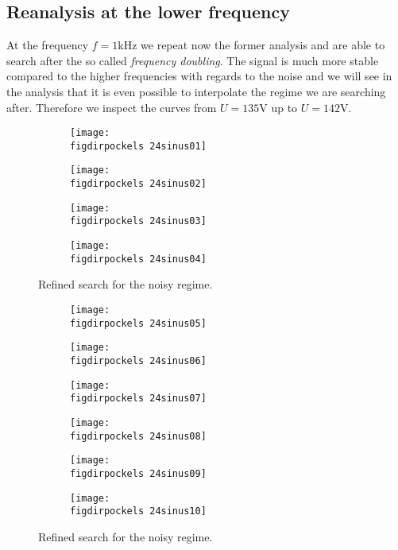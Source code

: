 \subsection{Reanalysis at the lower frequency}
At the frequency $f=1$kHz we repeat now the former analysis and are
able to search after the so called \textit{frequency doubling}.
The signal is much more stable compared to the higher frequencies 
with regards to the noise and we will see in the analysis that
it is even possible to interpolate the regime we are searching after.
Therefore we inspect the curves from $U=135$V up to $U=142$V.
\begin{figure}
    \begin{subfigure}[b]{\picwidth}
        \texttt{[image: \\figdirpockels 24sinus01]}
        \caption{}
    \end{subfigure}
    \begin{subfigure}[b]{\picwidth}
        \texttt{[image: \\figdirpockels 24sinus02]}
        \caption{}
    \end{subfigure}
    \begin{subfigure}[b]{\picwidth}
        \texttt{[image: \\figdirpockels 24sinus03]}
        \caption{}
    \end{subfigure}
    \begin{subfigure}[b]{\picwidth}
        \texttt{[image: \\figdirpockels 24sinus04]}
        \caption{}
    \end{subfigure}
    \caption{Refined search for the noisy regime.}
    \label{fig:sinus7}
\end{figure}

\begin{figure}
    \begin{subfigure}[b]{\picwidth}
        \texttt{[image: \\figdirpockels 24sinus05]}
        \caption{}
    \end{subfigure}\qquad
    \begin{subfigure}[b]{\picwidth}
        \texttt{[image: \\figdirpockels 24sinus06]}
        \caption{}
    \end{subfigure}
    \begin{subfigure}[b]{\picwidth}
        \texttt{[image: \\figdirpockels 24sinus07]}
        \caption{}
    \end{subfigure}
    \begin{subfigure}[b]{\picwidth}
        \texttt{[image: \\figdirpockels 24sinus08]}
        \caption{}
    \end{subfigure}
    \begin{subfigure}[b]{\picwidth}
        \texttt{[image: \\figdirpockels 24sinus09]}
        \caption{}
    \end{subfigure}
    \begin{subfigure}[b]{\picwidth}
        \texttt{[image: \\figdirpockels 24sinus10]}
        \caption{}
    \end{subfigure}
    \caption{Refined search for the noisy regime.}
    \label{fig:sinus8}
\end{figure}
